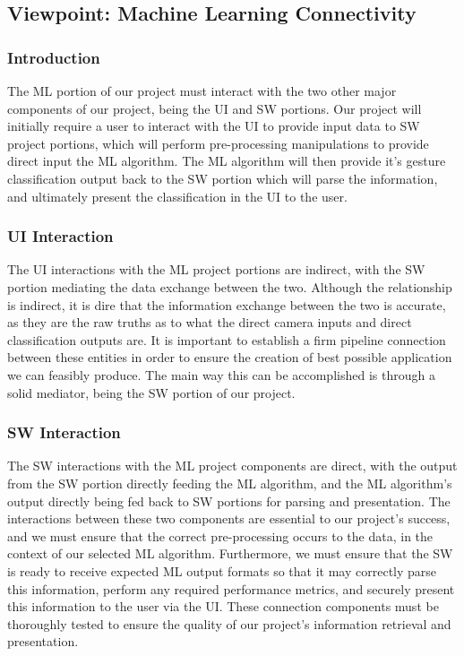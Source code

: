 \documentclass[onecolumn, draftclsnofoot,10pt, compsoc]{IEEEtran}
\begin{document}
\subsection{Viewpoint: Machine Learning Connectivity}
\subsubsection{Introduction}
The ML portion of our project must interact with the two other major components of our project, being the UI and SW portions. Our project will initially require a user to interact with the UI to provide input data to SW project portions, which will perform pre-processing manipulations to provide direct input the ML algorithm. The ML algorithm will then provide it's gesture classification output back to the SW portion which will parse the information, and ultimately present the classification in the UI to the user. 
\subsubsection{UI Interaction}
The UI interactions with the ML project portions are indirect, with the SW portion mediating the data exchange between the two. Although the relationship is indirect, it is dire that the information exchange between the two is accurate, as they are the raw truths as to what the direct camera inputs and direct classification outputs are. It is important to establish a firm pipeline connection between these entities in order to ensure the creation of best possible application we can feasibly produce. The main way this can be accomplished is through a solid mediator, being the SW portion of our project.
\subsubsection{SW Interaction}
The SW interactions with the ML project components are direct, with the output from the SW portion directly feeding the ML algorithm, and the ML algorithm's output directly being fed back to SW portions for parsing and presentation. The interactions between these two components are essential to our project's success, and we must ensure that the correct pre-processing occurs to the data, in the context of our selected ML algorithm. Furthermore, we must ensure that the SW is ready to receive expected ML output formats so that it may correctly parse this information, perform any required performance metrics, and securely present this information to the user via the UI. These connection components must be thoroughly tested to ensure the quality of our project's information retrieval and presentation.
\end{document}
